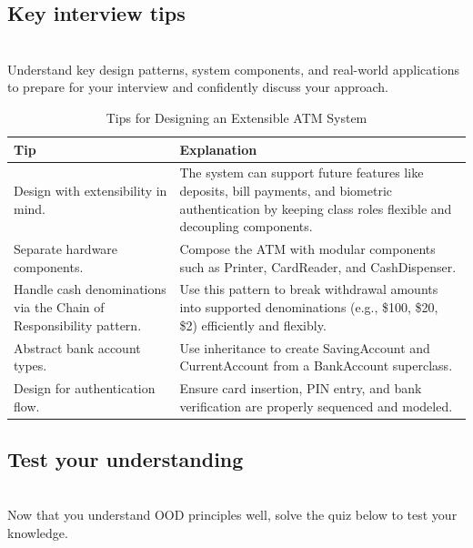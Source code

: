 \subsection{Key interview tips}\label{RKI9G_-Mc0RfvQ-FxJm5R}
\\
Understand key design patterns, system components, and real-world applications to prepare for your interview and confidently discuss your approach.

\begin{table}[h!]
\centering
\begin{tabular}{|p{6cm}|p{9cm}|}
\hline
\textbf{Tip} & \textbf{Explanation} \\
\hline
Design with extensibility in mind. & 
The system can support future features like deposits, bill payments, and biometric authentication by keeping class roles flexible and decoupling components. \\
\hline
Separate hardware components. & 
Compose the ATM with modular components such as Printer, CardReader, and CashDispenser. \\
\hline
Handle cash denominations via the Chain of Responsibility pattern. & 
Use this pattern to break withdrawal amounts into supported denominations (e.g., \$100, \$20, \$2) efficiently and flexibly. \\
\hline
Abstract bank account types. & 
Use inheritance to create SavingAccount and CurrentAccount from a BankAccount superclass. \\
\hline
Design for authentication flow. & 
Ensure card insertion, PIN entry, and bank verification are properly sequenced and modeled. \\
\hline
\end{tabular}
\caption{Tips for Designing an Extensible ATM System}
\label{tab:atm_design_tips}
\end{table}


\subsection{Test your understanding}\label{GcYiLJCDungD7talOAQKa}
\\
Now that you understand OOD principles well, solve the quiz below to test your knowledge.

